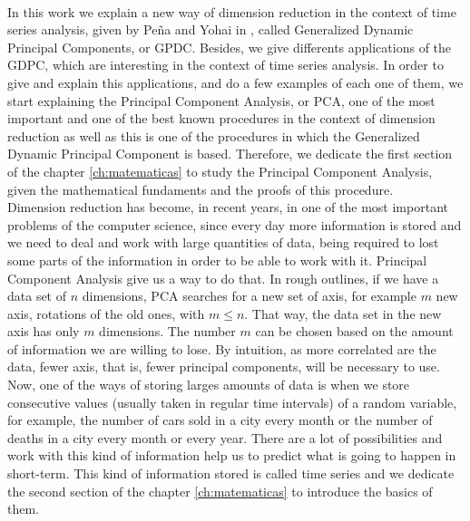 \vspace{0.7cm}
\\

In this work we explain a new way of dimension reduction in the context of time series analysis, given by Peña and Yohai in \cite{pena16}, called Generalized Dynamic Principal Components, or GPDC. Besides, we give differents applications of the GDPC, which are interesting in the context of time series analysis. In order to give and explain this applications, and do a few examples of each one of them, we start explaining the Principal Component Analysis, or PCA, one of the most important and one of the best known procedures in the context of dimension reduction as well as this is one of the procedures in which the Generalized Dynamic Principal Component is based. Therefore, we dedicate the first section of the chapter \ref{ch:matematicas} to study the Principal Component Analysis, given the mathematical fundaments and the proofs of this procedure.\\

Dimension reduction has become, in recent years, in one of the most important problems of the computer science, since every day more information is stored and we need to deal and work with large quantities of data, being required to lost some parts of the information in order to be able to work with it. Principal Component Analysis give us a way to do that. In rough outlines, if we have a data set of $n$ dimensions, PCA searches for a new set of axis, for example $m$ new axis, rotations of the old ones, with $m \leq n$. That way, the data set in the new axis has only $m$ dimensions. The number $m$ can be chosen based on the amount of information we are willing to lose. By intuition, as more correlated are the data, fewer axis, that is, fewer principal components, will be necessary to use.\\

Now, one of the ways of storing larges amounts of data is when we store consecutive values (usually taken in regular time intervals) of a random variable, for example, the number of cars sold in a city every month or the number of deaths in a city every month or every year. There are a lot of possibilities and work with this kind of information help us to predict what is going to happen in short-term. This kind of information stored is called time series and we dedicate the second section of the chapter \ref{ch:matematicas} to introduce the basics of them.\\


